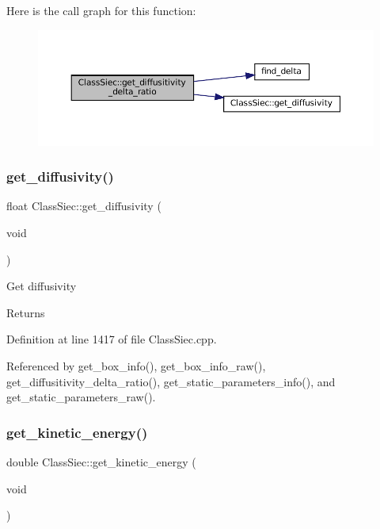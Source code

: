 Here is the call graph for this function\+:\nopagebreak
\begin{figure}[H]
\begin{center}
\leavevmode
\includegraphics[width=350pt]{classClassSiec_ac410df30c33bfc1e1613390446e716db_cgraph}
\end{center}
\end{figure}
\mbox{\label{classClassSiec_a59f6ca8740aad85697541a0c9901d699}} 
\subsubsection{\texorpdfstring{get\+\_\+diffusivity()}{get\_diffusivity()}}
{\footnotesize\ttfamily float Class\+Siec\+::get\+\_\+diffusivity (\begin{DoxyParamCaption}\item[{void}]{ }\end{DoxyParamCaption})}

Get diffusivity \begin{DoxyReturn}{Returns}

\end{DoxyReturn}


Definition at line 1417 of file Class\+Siec.\+cpp.



Referenced by get\+\_\+box\+\_\+info(), get\+\_\+box\+\_\+info\+\_\+raw(), get\+\_\+diffusitivity\+\_\+delta\+\_\+ratio(), get\+\_\+static\+\_\+parameters\+\_\+info(), and get\+\_\+static\+\_\+parameters\+\_\+raw().

\mbox{\label{classClassSiec_ae5515f653846b695b3ab00682d15c6fc}} 
\subsubsection{\texorpdfstring{get\+\_\+kinetic\+\_\+energy()}{get\_kinetic\_energy()}}
{\footnotesize\ttfamily double Class\+Siec\+::get\+\_\+kinetic\+\_\+energy (\begin{DoxyParamCaption}\item[{void}]{ }\end{DoxyParamCaption})}

